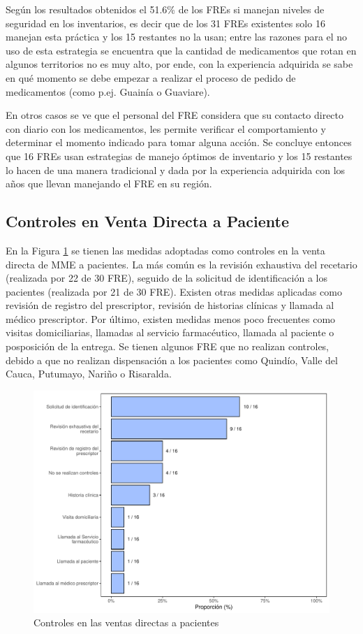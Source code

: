 \documentclass[
]{book}
\begin{document}
Según los resultados obtenidos el 51.6\% de los FREs si manejan niveles de seguridad en los inventarios, es decir que de los 31 FREs existentes solo 16 manejan esta práctica y los 15 restantes no la usan; entre las razones para el no uso de esta estrategia se encuentra que la cantidad de medicamentos que rotan en algunos territorios no es muy alto, por ende, con la experiencia adquirida se sabe en qué momento se debe empezar a realizar el proceso de pedido de medicamentos (como p.ej. Guainía o Guaviare).

En otros casos se ve que el personal del FRE considera que su contacto directo con diario con los medicamentos, les permite verificar el comportamiento y determinar el momento indicado para tomar alguna acción. Se concluye entonces que 16 FREs usan estrategias de manejo óptimos de inventario y los 15 restantes lo hacen de una manera tradicional y dada por la experiencia adquirida con los años que llevan manejando el FRE en su región.

\hypertarget{controles-en-venta-directa-a-paciente}{%
\subsection{Controles en Venta Directa a Paciente}\label{controles-en-venta-directa-a-paciente}}

En la Figura \ref{fig:ControlesVentasFRE} se tienen las medidas adoptadas como controles en la venta directa de MME a pacientes. La más común es la revisión exhaustiva del recetario (realizada por 22 de 30 FRE), seguido de la solicitud de identificación a los pacientes (realizada por 21 de 30 FRE). Existen otras medidas aplicadas como revisión de registro del prescriptor, revisión de historias clínicas y llamada al médico prescriptor. Por último, existen medidas menos poco frecuentes como visitas domiciliarias, llamadas al servicio farmacéutico, llamada al paciente o posposición de la entrega. Se tienen algunos FRE que no realizan controles, debido a que no realizan dispensación a los pacientes como Quindío, Valle del Cauca, Putumayo, Nariño o Risaralda.

\begin{figure}
\includegraphics[width=0.85\linewidth]{InformeFinal_files/figure-latex/ControlesVentasFRE-1} \caption{Controles en las ventas directas a pacientes}\label{fig:ControlesVentasFRE}
\end{figure}
\end{document}
